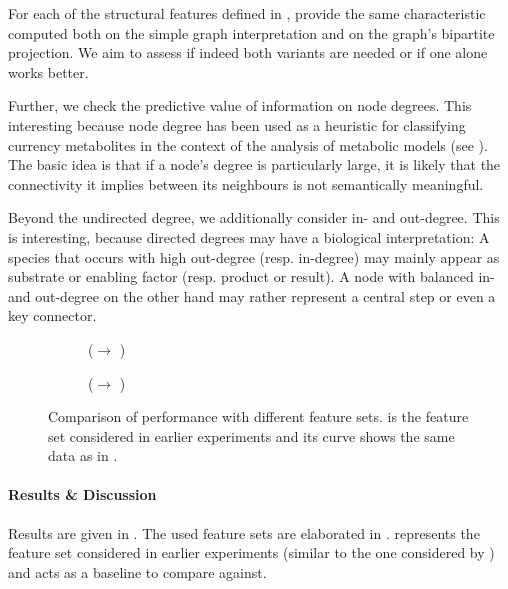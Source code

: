 \documentclass[
	fontsize=10pt, %
	twoside=false, %
	secnumdepth=1, %
  toc=indentunnumbered %
]{kaobook}
\begin{document}
For each of the structural features defined in ,
\nielsen{} provide the same characteristic computed both on the simple graph
interpretation and on the graph's bipartite projection. We aim to assess if
indeed both variants are needed or if one alone works better.

Further, we check the predictive value of information on node degrees.
This interesting because node degree has been used as a heuristic for
classifying currency metabolites in the context of the analysis of metabolic
models (see ). The basic idea is that if a node's
degree is particularly large, it is likely that the connectivity it implies
between its neighbours is not semantically meaningful.

Beyond the undirected degree, we additionally consider in- and out-degree. This
is interesting, because directed degrees may have a biological interpretation: A
species that occurs with high out-degree (resp. in-degree) may mainly appear as
substrate or enabling factor (resp. product or result). A node with balanced in-
and out-degree on the other hand may rather represent a central step or even a
key connector.


\begin{figure}[h]
  \centering
  \begin{subfigure}{0.48\linewidth}
    \caption{(\ADLast $\rightarrow$ \PDMap)}
  \end{subfigure}
  \begin{subfigure}{0.48\linewidth}
    \caption{(\ADLast $\rightarrow$ \ReconMap{})}
  \end{subfigure}
  \caption[Comparison of performance with different feature sets.]{Comparison of
    performance with different feature sets.  is the
    feature set considered in earlier experiments and its curve shows the same
    data as in .}
  \label{fig:feature-importance}
\end{figure}


\paragraph{Results \& Discussion} Results are given in
. The used feature sets are elaborated in
.  represents the feature set
considered in earlier experiments (similar to the one considered by \nielsen{})
and acts as a baseline to compare against.
\end{document}

